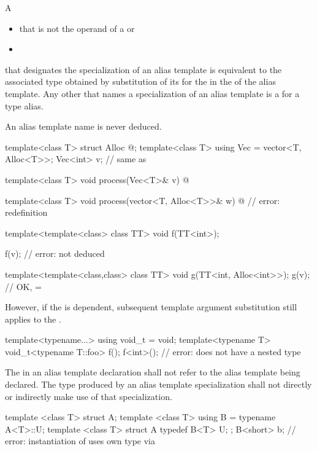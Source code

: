 \pnum
A
\begin{itemize}
\item
{}
that is not the operand of a  or
\item
{}
\end{itemize}
that designates the specialization of
an alias template is equivalent to the associated type obtained by
substitution of its  for the
 in the  of
the alias template.
Any other 
that names a specialization of an alias template is
a  for a type alias.
\begin{note}
An alias template name is never deduced.
\end{note}
\begin{example}
\begin{codeblock}
template<class T> struct Alloc { @\commentellip@ };
template<class T> using Vec = vector<T, Alloc<T>>;
Vec<int> v;         // same as 

template<class T>
  void process(Vec<T>& v)
  { @\commentellip@ }

template<class T>
  void process(vector<T, Alloc<T>>& w)
  { @\commentellip@ }     // error: redefinition

template<template<class> class TT>
  void f(TT<int>);

f(v);               // error:  not deduced

template<template<class,class> class TT>
  void g(TT<int, Alloc<int>>);
g(v);               // OK,  = 
\end{codeblock}

\end{example}

\pnum
However, if the  is dependent, subsequent template
argument substitution still applies to the .
\begin{example}
\begin{codeblock}
template<typename...> using void_t = void;
template<typename T> void_t<typename T::foo> f();
f<int>();           // error:  does not have a nested type 
\end{codeblock}
\end{example}

\pnum
The  in an alias template declaration shall not refer to
the alias template being declared. The type produced by an alias template
specialization shall not directly or indirectly make use of that specialization.
\begin{example}
\begin{codeblock}
template <class T> struct A;
template <class T> using B = typename A<T>::U;
template <class T> struct A {
  typedef B<T> U;
};
B<short> b;         // error: instantiation of  uses own type via 
\end{codeblock}
\end{example}

